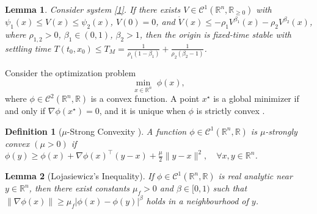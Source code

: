 \documentclass[letterpaper, 10 pt, conference]{ieeeconf}
\newtheorem{definition}{Definition}
\newtheorem{lemma}{Lemma}\let\labelindent\relax
\begin{document}
\begin{lemma}{\cite{polyakov_fix}}
Consider system \eqref{1}. If there exists $V \in \mathcal{C}^1(\mathbb{R}^n,\mathbb{R}_{\ge 0})$ with $\psi_1(x) \le V(x) \le \psi_2(x)$, $V(0)=0$, and $\dot V(x) \le -\rho_1 V^{\beta_1}(x) - \rho_2 V^{\beta_2}(x)$, where $\rho_{1,2}>0$, $\beta_1 \in (0,1)$, $\beta_2>1$, then the origin is fixed-time stable with settling time $T(t_0,x_0) \le T_M = \frac{1}{\rho_1(1-\beta_1)} + \frac{1}{\rho_2(\beta_2-1)}$.
\end{lemma}

Consider the optimization problem
\begin{equation}\label{eq:opt_problem}
\min_{x \in \mathbb{R}^n} \; \phi(x),
\end{equation}
where $\phi \in \mathcal{C}^2(\mathbb{R}^n,\mathbb{R})$ is a convex function. A point $x^\star$ is a global minimizer if and only if $\nabla \phi(x^\star)=0$, and it is unique when $\phi$ is strictly convex \cite{boyd_optmz}.
\begin{definition}[$\mu$-Strong Convexity ] \cite{beck_convx}
A function $\phi \in \mathcal{C}^1(\mathbb{R}^n,\mathbb{R})$ is $\mu$-strongly convex $(\mu>0)$ if $\phi(y) \ge \phi(x) + \nabla \phi(x)^\top (y-x) + \frac{\mu}{2}\|y-x\|^2,
\quad \forall x,y \in \mathbb{R}^n$.
\end{definition}

\begin{lemma} [Lojasiewicz’s Inequality]\cite{l_ineq}
If $ \phi \in \mathcal{C}^1(\mathbb{R}^n, \mathbb{R}) $ is real analytic near $ y \in \mathbb{R}^n $, then there exist constants $ \mu_f > 0 $ and $ \beta \in [0,1) $ such that  
$
\|\nabla \phi(x)\| \geq \mu_f |\phi(x) - \phi(y)|^\beta
$
holds in a neighbourhood of $ y $.
\end{lemma}
\end{document}
